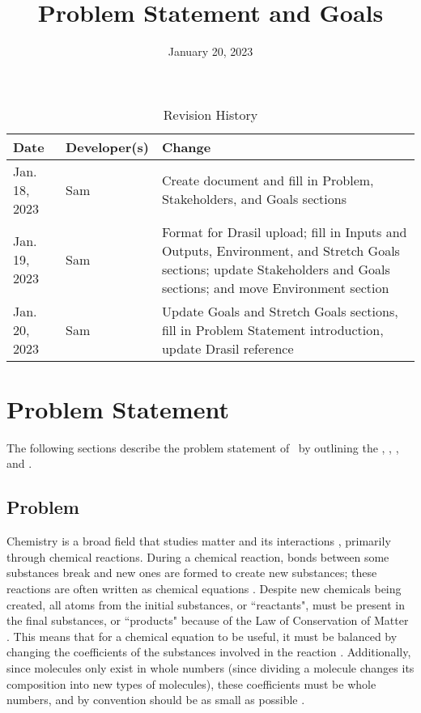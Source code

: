 \documentclass{article}
\title{Problem Statement and Goals\\\progname}
\author{\authname}
\date{January 20, 2023}
\begin{document}
\maketitle

\begin{table}[hp]
\caption{Revision History} \label{TblRevisionHistory}
\begin{tabularx}{\textwidth}{llX}
\toprule
\textbf{Date} & \textbf{Developer(s)} & \textbf{Change}\\
\midrule
Jan. 18, 2023 & Sam & Create document and fill in Problem, Stakeholders, and
Goals sections\\
Jan. 19, 2023 & Sam & Format for Drasil upload; fill in Inputs and Outputs,
Environment, and Stretch Goals sections; update Stakeholders and Goals
sections; and move Environment section\\
Jan. 20, 2023 & Sam & Update Goals and Stretch Goals sections, fill in
Problem Statement introduction, update Drasil reference\\
\bottomrule
\end{tabularx}
\end{table}

\section{Problem Statement}

\null\newline
\null\newline
\noindent The following sections describe the problem statement of \progname~by outlining
the , , , and .

\subsection{Problem} \label{prob}

Chemistry is a broad field that studies matter and its interactions
\cite{gordon_chm101_2023}, primarily through chemical reactions.
During a chemical reaction, bonds between some substances break and new ones are
formed to create new substances; these reactions are often written as chemical
equations \cite{lund_introduction_2023}. Despite new chemicals being created,
all atoms from the initial substances, or ``reactants", must be present in the
final substances, or ``products" because of the Law of Conservation of Matter
\cite{lund_introduction_2023}. This means that for a chemical equation to be
useful, it must be balanced by changing the coefficients of the substances
involved in the reaction \cite{lund_introduction_2023}. Additionally, since
molecules only exist in whole numbers (since dividing a molecule changes its
composition into new types of molecules), these coefficients must be whole
numbers, and by convention should be as small as possible
\cite{lund_introduction_2023}.
\end{document}
